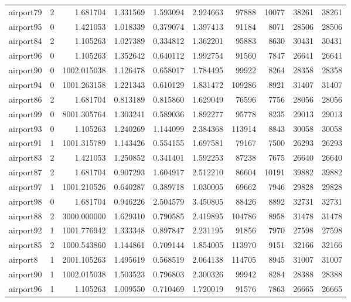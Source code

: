 \begin{longtable}{|l|r|r|r|r|r|r|r|r|r|}
airport79 & 2 & 1.681704 & 1.331569 & 1.593094 & 2.924663 & 97888 & 10077 & 38261 & 38261 \\
airport95 & 0 & 1.421053 & 1.018339 & 0.379074 & 1.397413 & 91184 & 8071 & 28506 & 28506 \\
airport84 & 2 & 1.105263 & 1.027389 & 0.334812 & 1.362201 & 95883 & 8630 & 30431 & 30431 \\
airport96 & 0 & 1.105263 & 1.352642 & 0.640112 & 1.992754 & 91560 & 7847 & 26641 & 26641 \\
airport90 & 0 & 1002.015038 & 1.126478 & 0.658017 & 1.784495 & 99922 & 8264 & 28358 & 28358 \\
airport94 & 0 & 1001.263158 & 1.221343 & 0.610129 & 1.831472 & 109286 & 8921 & 31407 & 31407 \\
airport86 & 2 & 1.681704 & 0.813189 & 0.815860 & 1.629049 & 76596 & 7756 & 28056 & 28056 \\
airport99 & 0 & 8001.305764 & 1.303241 & 0.589036 & 1.892277 & 95778 & 8235 & 29013 & 29013 \\
airport93 & 0 & 1.105263 & 1.240269 & 1.144099 & 2.384368 & 113914 & 8843 & 30058 & 30058 \\
airport91 & 1 & 1001.315789 & 1.143426 & 0.554155 & 1.697581 & 79167 & 7500 & 26293 & 26293 \\
airport83 & 2 & 1.421053 & 1.250852 & 0.341401 & 1.592253 & 87238 & 7675 & 26640 & 26640 \\
airport87 & 2 & 1.681704 & 0.907293 & 1.604917 & 2.512210 & 86604 & 10191 & 39882 & 39882 \\
airport97 & 1 & 1001.210526 & 0.640287 & 0.389718 & 1.030005 & 69662 & 7946 & 29828 & 29828 \\
airport98 & 0 & 1.681704 & 0.946226 & 2.504579 & 3.450805 & 88426 & 8892 & 32731 & 32731 \\
airport88 & 2 & 3000.000000 & 1.629310 & 0.790585 & 2.419895 & 104786 & 8958 & 31478 & 31478 \\
airport92 & 1 & 1001.776942 & 1.333348 & 0.897847 & 2.231195 & 91856 & 7970 & 27598 & 27598 \\
airport85 & 2 & 1000.543860 & 1.144861 & 0.709144 & 1.854005 & 113970 & 9151 & 32166 & 32166 \\
airport8 & 1 & 2001.105263 & 1.495619 & 0.568519 & 2.064138 & 114705 & 8945 & 31007 & 31007 \\
airport90 & 1 & 1002.015038 & 1.503523 & 0.796803 & 2.300326 & 99942 & 8284 & 28388 & 28388 \\
airport96 & 1 & 1.105263 & 1.009550 & 0.710469 & 1.720019 & 91576 & 7863 & 26665 & 26665 \\

\end{longtable}
